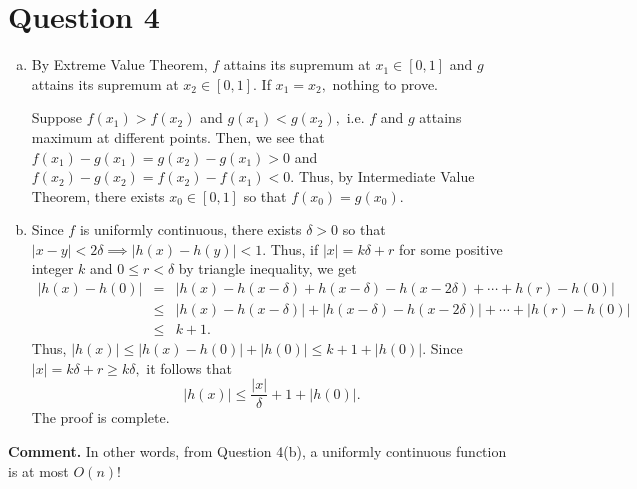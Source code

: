 \documentclass{article}
\begin{document}
\section*{Question 4}
\begin{enumerate}[(a)]
    \item By Extreme Value Theorem, $f$ attains its supremum at $x_1\in[0,1]$ and $g$ attains its supremum at $x_2\in[0,1].$ If $x_1=x_2,$ nothing to prove.
    
    Suppose $f(x_1)>f(x_2)$ and $g(x_1)<g(x_2),$ i.e. $f$ and $g$ attains maximum at different points. Then, we see that $f(x_1)-g(x_1)=g(x_2)-g(x_1)>0$ and $f(x_2)-g(x_2)=f(x_2)-f(x_1)<0.$ Thus, by Intermediate Value Theorem, there exists $x_0\in[0,1]$ so that $f(x_0)=g(x_0).$
    \item Since $f$ is uniformly continuous, there exists $\delta>0$ so that $|x-y|<2\delta\implies|h(x)-h(y)|<1.$ Thus, if $|x|=k\delta+r$ for some positive integer $k$ and $0\leq r<\delta$ by triangle inequality, we get 
    \begin{eqnarray*}
    |h(x)-h(0)|&=&|h(x)-h(x-\delta)+h(x-\delta)-h(x-2\delta)+\cdots+h(r)-h(0)|\\
    &\leq&|h(x)-h(x-\delta)|+|h(x-\delta)-h(x-2\delta)|+\cdots+|h(r)-h(0)|\\
    &\leq&k+1.
    \end{eqnarray*}
    Thus, $|h(x)|\leq |h(x)-h(0)|+|h(0)|\leq k+1+|h(0)|.$ Since $|x|=k\delta+r\geq k\delta,$ it follows that $$|h(x)|\leq \dfrac{|x|}{\delta}+1+|h(0)|.$$ The proof is complete.
\end{enumerate}
\textbf{Comment.} In other words, from Question 4(b), a uniformly continuous function is at most $O(n)!$
\end{document}
